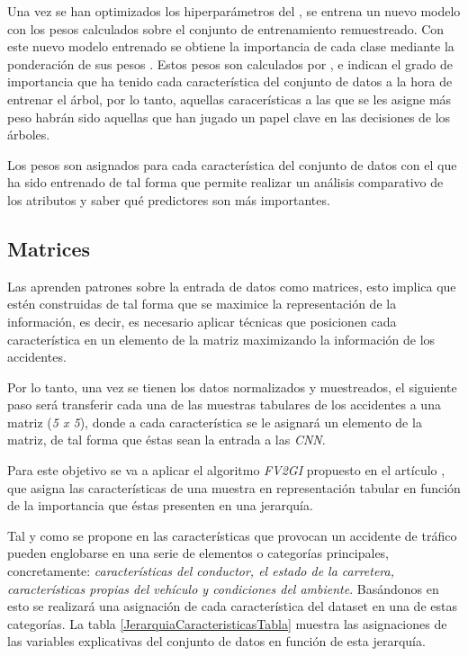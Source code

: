         Una vez se han optimizados los hiperparámetros del , se entrena un nuevo modelo con los pesos calculados sobre el conjunto de entrenamiento remuestreado. Con este nuevo modelo  entrenado se obtiene la importancia de cada clase mediante la ponderación de sus pesos \cite{XGBoostFeatureWeightsMeaning}. Estos pesos son calculados por , e indican el grado de importancia que ha tenido cada característica del conjunto de datos a la hora de entrenar el árbol, por lo tanto, aquellas caracerísticas a las que se les asigne más peso habrán sido aquellas que han jugado un papel clave en las decisiones de los árboles.

        Los pesos son asignados para cada característica del conjunto de datos con el que ha sido entrenado  de tal forma que permite realizar un análisis comparativo de los atributos y saber qué predictores son más importantes.


    \subsection{Matrices}


        Las  aprenden patrones sobre la entrada de datos como matrices, esto implica que estén construidas de tal forma que se maximice la representación de la información, es decir, es necesario aplicar técnicas que posicionen cada característica en un elemento de la matriz maximizando la información de los accidentes.

        Por lo tanto, una vez se tienen los datos normalizados y muestreados, el siguiente paso será transferir cada una de las muestras tabulares de los accidentes a una matriz (\textit{5 x 5}), donde a cada característica se le asignará un elemento de la matriz, de tal forma que éstas sean la entrada a las \textit{CNN}.

        Para este objetivo se va a aplicar el algoritmo \textit{FV2GI} propuesto en el artículo \cite{TASPCNN}, que asigna las características de una muestra en representación tabular en función de la importancia que éstas presenten en una jerarquía.

        Tal y como se propone en \cite{JerarquiaImagenes} las características que provocan un accidente de tráfico pueden englobarse en una serie de elementos o categorías principales, concretamente: \textit{características del conductor, el estado de la carretera, características propias del vehículo y condiciones del ambiente}. Basándonos en esto se realizará una asignación de cada característica del dataset en una de estas categorías. La tabla \eqref{JerarquiaCaracteristicasTabla} muestra las asignaciones de las variables explicativas del conjunto de datos en función de esta jerarquía.



